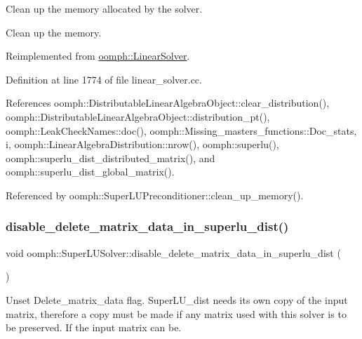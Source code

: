 Clean up the memory allocated by the solver. 

Clean up the memory. 

Reimplemented from \hyperlink{classoomph_1_1LinearSolver_a9d66f3262e80ca06a365f98216afd85f}{oomph\+::\+Linear\+Solver}.



Definition at line 1774 of file linear\+\_\+solver.\+cc.



References oomph\+::\+Distributable\+Linear\+Algebra\+Object\+::clear\+\_\+distribution(), oomph\+::\+Distributable\+Linear\+Algebra\+Object\+::distribution\+\_\+pt(), oomph\+::\+Leak\+Check\+Names\+::doc(), oomph\+::\+Missing\+\_\+masters\+\_\+functions\+::\+Doc\+\_\+stats, i, oomph\+::\+Linear\+Algebra\+Distribution\+::nrow(), oomph\+::superlu(), oomph\+::superlu\+\_\+dist\+\_\+distributed\+\_\+matrix(), and oomph\+::superlu\+\_\+dist\+\_\+global\+\_\+matrix().



Referenced by oomph\+::\+Super\+L\+U\+Preconditioner\+::clean\+\_\+up\+\_\+memory().

\mbox{\label{classoomph_1_1SuperLUSolver_a887c4a5fd19034f7a74d91d453d4f425}} 
\subsubsection{\texorpdfstring{disable\+\_\+delete\+\_\+matrix\+\_\+data\+\_\+in\+\_\+superlu\+\_\+dist()}{disable\_delete\_matrix\_data\_in\_superlu\_dist()}}
{\footnotesize\ttfamily void oomph\+::\+Super\+L\+U\+Solver\+::disable\+\_\+delete\+\_\+matrix\+\_\+data\+\_\+in\+\_\+superlu\+\_\+dist (\begin{DoxyParamCaption}{ }\end{DoxyParamCaption})\hspace{0.3cm}{\ttfamily [inline]}}



Unset Delete\+\_\+matrix\+\_\+data flag. Super\+L\+U\+\_\+dist needs its own copy of the input matrix, therefore a copy must be made if any matrix used with this solver is to be preserved. If the input matrix can be. 



